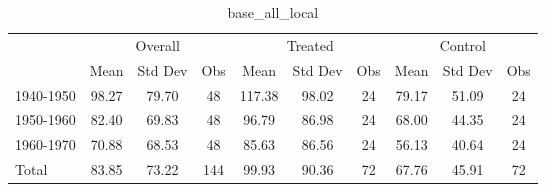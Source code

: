 \begin{table}[htbp]\centering
\def\sym#1{\ifmmode^{#1}\else\(^{#1}\)\fi}
\caption{base\_all\_local \label{tab1}}
\begin{tabular}{l*{3}{ccc}}
\toprule
                    &\multicolumn{3}{c}{Overall}           &\multicolumn{3}{c}{Treated}           &\multicolumn{3}{c}{Control}           \\
                    &        Mean&     Std Dev&         Obs&        Mean&     Std Dev&         Obs&        Mean&     Std Dev&         Obs\\
\midrule
1940-1950           &       98.27&       79.70&          48&      117.38&       98.02&          24&       79.17&       51.09&          24\\
1950-1960           &       82.40&       69.83&          48&       96.79&       86.98&          24&       68.00&       44.35&          24\\
1960-1970           &       70.88&       68.53&          48&       85.63&       86.56&          24&       56.13&       40.64&          24\\
Total               &       83.85&       73.22&         144&       99.93&       90.36&          72&       67.76&       45.91&          72\\
\bottomrule
\end{tabular}
\end{table}
